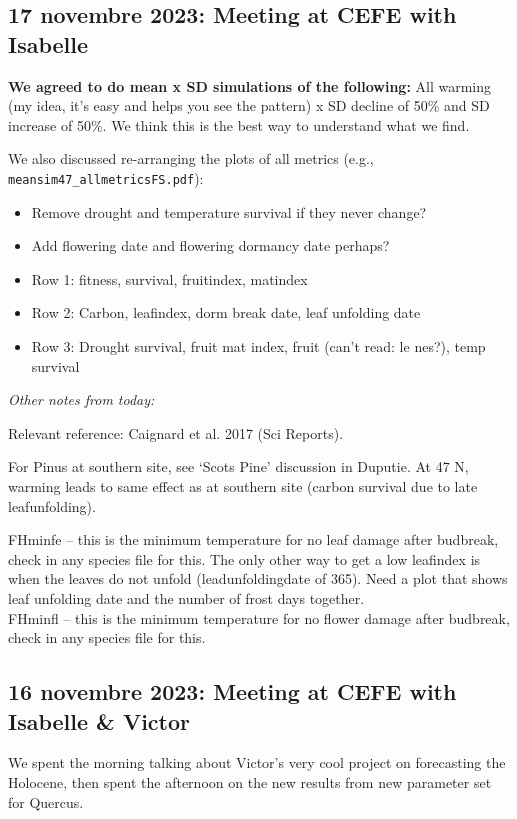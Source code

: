 \documentclass[11pt,letter]{article}
\begin{document}
\subsection{17 novembre 2023: Meeting at CEFE with Isabelle} %

{\bf We agreed to do mean x SD simulations of the following:} All warming (my idea, it's easy and helps you see the pattern) x SD decline of 50\% and SD increase of 50\%. We think this is the best way to understand what we find. 

We also discussed re-arranging the plots of all metrics (e.g., \verb|meansim47_allmetricsFS.pdf|): 
\begin{itemize}
\item Remove drought and temperature survival if they never change?
\item Add flowering date and flowering dormancy date perhaps?
\item Row 1: fitness, survival, fruitindex, matindex
\item Row 2: Carbon, leafindex, dorm break date, leaf unfolding date
\item Row 3: Drought survival, fruit mat index, fruit (can't read: le nes?), temp survival
\end{itemize}

\emph{Other notes from today:}

Relevant reference: Caignard et al. 2017 (Sci Reports).

For Pinus at southern site, see `Scots Pine' discussion in Duputie. At 47 N, warming leads to same effect as at southern site (carbon survival due to late leafunfolding).

FHminfe -- this is the minimum temperature for no leaf damage after budbreak, check in any species file for this. The only other way to get a low leafindex is when the leaves do not unfold (leadunfoldingdate of 365). Need a plot that shows leaf unfolding date and the number of frost days together. \\
FHminfl -- this is the minimum temperature for no flower damage after budbreak, check in any species file for this.\\


\subsection{16 novembre 2023: Meeting at CEFE with Isabelle \& Victor}

We spent the morning talking about Victor's very cool project on forecasting the Holocene, then spent the afternoon on the new results from new parameter set for Quercus. \\
\end{document}
